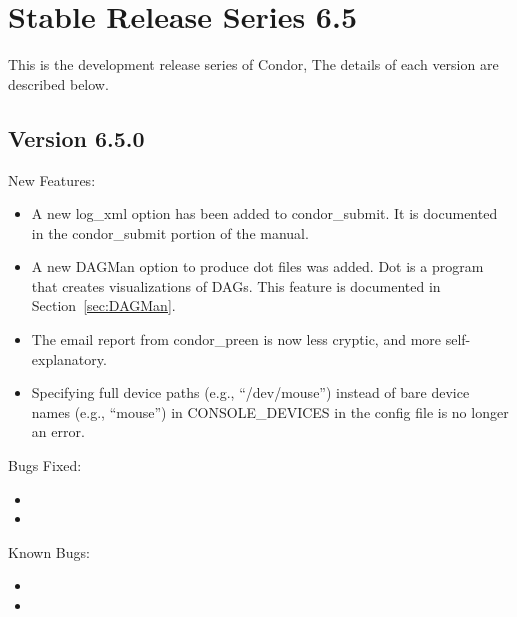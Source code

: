 \section{\label{sec:History-6-5}Stable Release Series 6.5}

This is the development release series of Condor,
The details of each version are described below.


\subsection{\label{sec:New-6-5-0}Version 6.5.0}
\noindent New Features:
\begin{itemize}

\item A new log\_xml option has been added to condor\_submit. It is
documented in the condor\_submit portion of the manual.

\item A new DAGMan option to produce dot files was added. Dot is a
program that creates visualizations of DAGs. This feature is
documented in Section~\ref{sec:DAGMan}.

\item The email report from condor_preen is now less cryptic, and
more self-explanatory.

\item Specifying full device paths (e.g., ``/dev/mouse'') instead of bare
device names (e.g., ``mouse'') in CONSOLE_DEVICES in the config file is no
longer an error.

\end{itemize}

\noindent Bugs Fixed:
\begin{itemize}

\item 

\item 

\end{itemize}

\noindent Known Bugs:
\begin{itemize}
\item 

\item 

\end{itemize}
